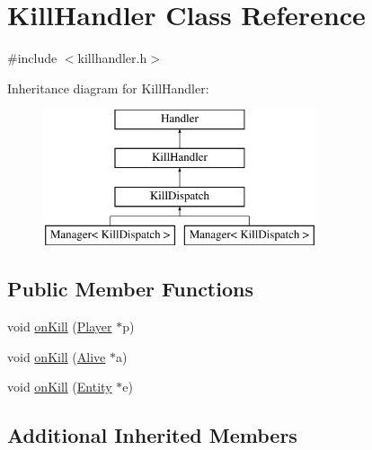 \hypertarget{class_kill_handler}{\section{Kill\-Handler Class Reference}
\label{class_kill_handler}
}


{\ttfamily \#include $<$killhandler.\-h$>$}

Inheritance diagram for Kill\-Handler\-:\begin{figure}[H]
\begin{center}
\leavevmode
\includegraphics[height=4.000000cm]{class_kill_handler}
\end{center}
\end{figure}
\subsection*{Public Member Functions}
\begin{DoxyCompactItemize}
\item 
void \hyperlink{class_kill_handler_ad5b9007b910c238f62930dc7ba3cf8fc}{on\-Kill} (\hyperlink{class_player}{Player} $\ast$p)
\item 
void \hyperlink{class_kill_handler_a6fa4f74ade6390de9539116dae4359c4}{on\-Kill} (\hyperlink{class_alive}{Alive} $\ast$a)
\item 
void \hyperlink{class_kill_handler_a0da0e64f9ec3eaedd7b6fe2b421e26c8}{on\-Kill} (\hyperlink{class_entity}{Entity} $\ast$e)
\end{DoxyCompactItemize}
\subsection*{Additional Inherited Members}


